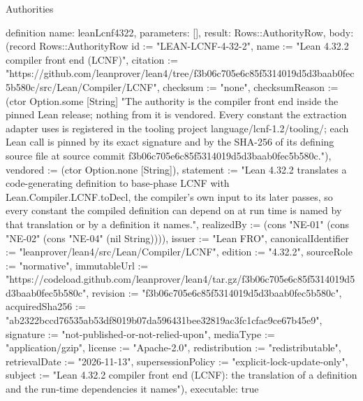 \begin{lexlean}{Authorities}
\begin{semanticmodule}
definition{
  name: leanLcnf4322,
  parameters: [],
  result: Rows::AuthorityRow,
  body: (record Rows::AuthorityRow {id := "LEAN-LCNF-4-32-2", name := "Lean 4.32.2 compiler front end (LCNF)", citation := "https://github.com/leanprover/lean4/tree/f3b06c705e6c85f5314019d5d3baab0fec5b580c/src/Lean/Compiler/LCNF", checksum := "none", checksumReason := (ctor Option.some [String] "The authority is the compiler front end inside the pinned Lean release; nothing from it is vendored. Every constant the extraction adapter uses is registered in the tooling project language/lcnf-1.2/tooling/; each Lean call is pinned by its exact signature and by the SHA-256 of its defining source file at source commit f3b06c705e6c85f5314019d5d3baab0fec5b580c."), vendored := (ctor Option.none [String]), statement := "Lean 4.32.2 translates a code-generating definition to base-phase LCNF with Lean.Compiler.LCNF.toDecl, the compiler's own input to its later passes, so every constant the compiled definition can depend on at run time is named by that translation or by a definition it names.", realizedBy := (cons "NE-01" (cons "NE-02" (cons "NE-04" (nil String)))), issuer := "Lean FRO", canonicalIdentifier := "leanprover/lean4/src/Lean/Compiler/LCNF", edition := "4.32.2", sourceRole := "normative", immutableUrl := "https://codeload.github.com/leanprover/lean4/tar.gz/f3b06c705e6c85f5314019d5d3baab0fec5b580c", revision := "f3b06c705e6c85f5314019d5d3baab0fec5b580c", acquiredSha256 := "ab2322bccd76535ab53df8019b07da596431bee32819ac3fc1cfac9ce67b45e9", signature := "not-published-or-not-relied-upon", mediaType := "application/gzip", license := "Apache-2.0", redistribution := "redistributable", retrievalDate := "2026-11-13", supersessionPolicy := "explicit-lock-update-only", subject := "Lean 4.32.2 compiler front end (LCNF): the translation of a definition and the run-time dependencies it names"}),
  executable: true
}


\end{semanticmodule}
\end{lexlean}
